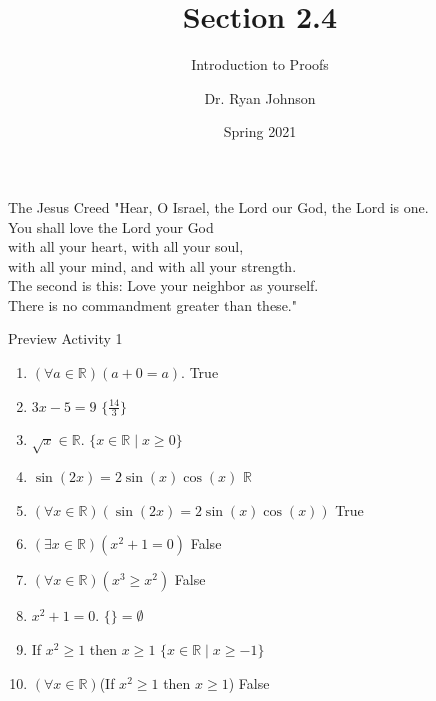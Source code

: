 \documentclass{beamer}
\title{Section 2.4}
\subtitle{Introduction to Proofs}
\author{Dr. Ryan Johnson}
\institute{Grace College}
\date{Spring 2021}
\begin{document}
\begin{frame}[plain]
    \maketitle
\end{frame}

\begin{frame}{The Jesus Creed}
\Large{
"Hear, O Israel, the Lord our God, the Lord is one.\\
You shall love the Lord your God\\
\;\; with all your heart, with all your soul,\\
\;\; with all your mind, and with all your strength.\\
The second is this: Love your neighbor as yourself.\\
There is no commandment greater than these."
}
\end{frame}

\begin{frame}{Preview Activity 1}
    \begin{enumerate}
        \item $(\forall a \in \mathbb{R}) (a + 0 = a)$. \pause \hspace{.5 in} True \pause
        \item $3x - 5 = 9$ \pause \hspace{.5 in} $\{\frac{14}{3}\}$  \pause
        \item $\sqrt{x} \in \mathbb{R}$. \pause \hspace{.5 in} $\{x \in \mathbb{R} \; | \; x \geq 0\}$   \pause
        \item $\sin(2x) = 2\sin(x)\cos(x)$ \pause \hspace{.5 in} $\mathbb{R}$  \pause
        \item $(\forall x \in \mathbb{R})(\sin(2x) = 2\sin(x)\cos(x))$ \pause \hspace{.5 in} True \pause
        \item $(\exists x \in \mathbb{R})(x^2 + 1 = 0)$ \pause \hspace{.5 in} False \pause
        \item $(\forall x \in \mathbb{R})(x^3 \geq x^2)$ \pause \hspace{.5 in} False \pause
        \item $x^2 + 1 = 0$. \pause \hspace{.5 in} $\{ \} = \emptyset$ \pause
        \item If $x^2 \geq 1$ then $x \geq 1$ \pause \hspace{.5 in} $\{x \in \mathbb{R} \; | \; x \geq -1\}$ \pause
        \item $(\forall x \in \mathbb{R})$(If $x^2 \geq 1$ then $x \geq 1$) \pause \hspace{.5 in} False
    \end{enumerate}
\end{frame}
\end{document}
